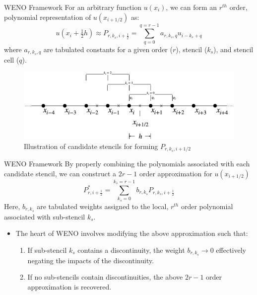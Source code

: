 \documentclass[9pt]{beamer}
\begin{document}
\begin{frame}{WENO Framework}
  For an arbitrary function $u(x_i)$, we can form an $r^{th}$ order, polynomial representation of $u(x_{i+1/2})$ as:
  \begin{equation}
    u(x_i+\tfrac{1}{2}h) \approx P_{r,k_s,i+\frac{1}{2}}= \sum_{q=0}^{q=r-1}a_{r,k_s,q}u_{i-k_s+q}\label{eq:PolynomialReconstruction}
  \end{equation}
  where $a_{r,k_s,q}$ are tabulated constants for a given order ($r$), stencil ($k_s$), and stencil cell ($q$).
  \begin{figure}[H]
    \centering
    \includegraphics[scale=0.165]{StencilReconstruct.png}\caption{Illustration of candidate stencils for forming $P_{r,k_s,i+1/2}$}
      \label{fig: Stencil Graphic}
  \end{figure}
\end{frame}

\begin{frame}{WENO Framework}
  By properly combining the polynomials associated with each candidate stencil, we can construct a $2r-1$ order approximation for $u(x_{i+1/2})$
  \begin{equation}
    P^{*}_{r,i+\frac{1}{2}} = \sum_{k_s=0}^{k_s=r-1}b_{r,k_s}P_{r,k_s,i+\frac{1}{2}}\label{eq: Optimal Reconstruction Definition}
  \end{equation}
  Here, $b_{r,k_s}$ are tabulated weights assigned to the local, $r^{th}$ order polynomial associated with sub-stencil $k_s$.
  
  \begin{itemize}
    \item The heart of WENO involves modifying the above approximation such that:
    \begin{enumerate}
      \item If sub-stencil $k_s$ contains a discontinuity, the weight $b_{r,k_s} \longrightarrow 0$ effectively negating the impacts of the discontinuity.
      \item If no sub-stencils contain discontinuities, the above $2r-1$ order approximation is recovered.
    \end{enumerate}
  \end{itemize}
\end{frame}
\end{document}
